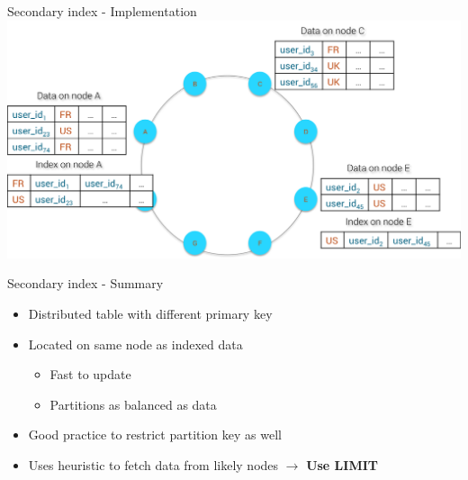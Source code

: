 \documentclass[
  10pt
]{beamer}
\begin{document}
\begin{frame}{Secondary index - Implementation \cite{datastax_secondary_index}}
  \includegraphics[width=1.0\textwidth]{resources/distributed_index.png}
\end{frame}

\begin{frame}{Secondary index - Summary \cite{datastax_secondary_index}}
  \begin{itemize}
    \item<1-> Distributed table with different primary key
    \item<2-> Located on same node as indexed data
      \begin{itemize}
        \item Fast to update
        \item Partitions as balanced as data
      \end{itemize}
    \item<3-> Good practice to restrict partition key as well
    \item<4-> Uses heuristic to fetch data from likely nodes $\rightarrow$ \textbf{Use LIMIT}
  \end{itemize}
\end{frame}
\end{document}
